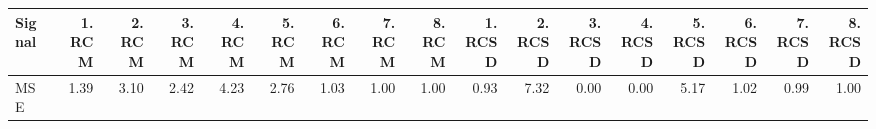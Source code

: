 \begin{tabular}{lrrrrrrrrrrrrrrrr}
\toprule
Signal & 1. RCM & 2. RCM & 3. RCM & 4. RCM & 5. RCM & 6. RCM & 7. RCM & 8. RCM & 1. RCSD & 2. RCSD & 3. RCSD & 4. RCSD & 5. RCSD & 6. RCSD & 7. RCSD & 8. RCSD \\
\midrule
MSE & 1.39 & 3.10 & 2.42 & 4.23 & 2.76 & 1.03 & 1.00 & 1.00 & 0.93 & 7.32 & 0.00 & 0.00 & 5.17 & 1.02 & 0.99 & 1.00 \\
\bottomrule
\end{tabular}
